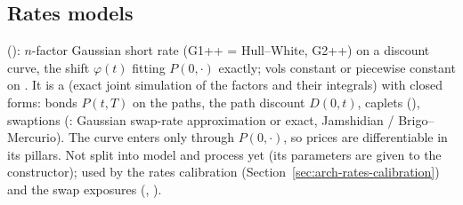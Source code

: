 \subsection{Rates models}\label{sec:arch-rates-models}
(): $n$-factor Gaussian short rate (G1++ = Hull--White, G2++) on a discount curve, the
shift $\varphi(t)$ fitting $P(0,\cdot)$ exactly; vols constant or piecewise constant on . It is a
 (exact joint simulation of the factors and their integrals) with closed forms: bonds
$P(t,T)$ on the paths, the path discount $D(0,t)$, caplets (), swaptions (: Gaussian
swap-rate approximation or exact, Jamshidian / Brigo--Mercurio). The curve enters only through $P(0,\cdot)$, so
prices are differentiable in its pillars. Not split into model and process yet (its parameters are given to the
constructor); used by the rates calibration (Section~\ref{sec:arch-rates-calibration}) and the swap exposures
(, ).
